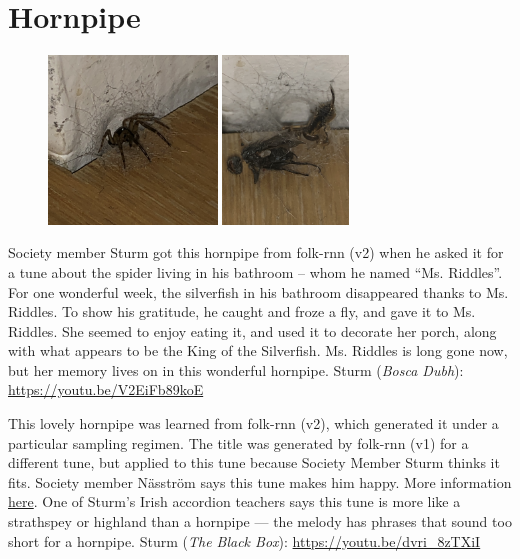 \documentclass[a4paper,notitlepage,twoside]{book}
\begin{document}
\clearpage
\section{Hornpipe}
{}  
 
\hypertarget{hornpipe:MsRiddles}{}
\begin{figure}
\includegraphics[width=0.4\textwidth]{MsRiddles.png}
\includegraphics[width=0.3\textwidth]{MsRiddles2.png}
\end{figure}
Society member Sturm got this hornpipe from folk-rnn (v2) 
when he asked it for a tune about the spider living in his bathroom – whom he named “Ms. Riddles”.
For one wonderful week, the silverfish in his bathroom disappeared thanks to Ms. Riddles. To show his gratitude, he caught and froze a fly, and gave it to Ms. Riddles. She seemed to enjoy eating it, and used it to decorate her porch, along with what appears to be the King of the Silverfish.
Ms. Riddles is long gone now, but her memory lives on in this wonderful hornpipe.
Sturm ({\em Bosca Dubh}): \url{https://youtu.be/V2EiFb89koE}

{}  
\hypertarget{hornpipe:LiddleShepe}{}
This lovely hornpipe was learned from folk-rnn (v2),
which generated it under a particular sampling regimen.
The title was generated by folk-rnn (v1) for a different tune, 
but applied to this tune because Society Member Sturm thinks it fits.
Society member Näsström says this tune makes him happy.
More information \href{https://highnoongmt.wordpress.com/2019/08/19/making-sense-of-the-folk-rnn-v2-model-part-11/}{here}.
One of Sturm's Irish accordion teachers says this tune is more like a strathspey or highland 
than a hornpipe --- the melody has phrases that sound too short for a hornpipe.
Sturm ({\em The Black Box}): \url{https://youtu.be/dvri_8zTXiI}
  
\end{document}
